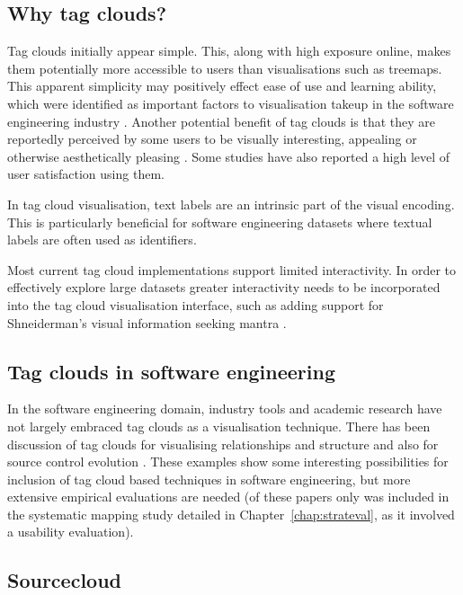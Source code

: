\subsection{Why tag clouds?}\label{sect:whytagclouds}

Tag clouds initially appear simple. This, along with high exposure online, makes them potentially more accessible to users than visualisations such as treemaps. This apparent simplicity may positively effect ease of use and learning ability, which were identified as important factors to visualisation takeup in the software engineering industry \citep{reiss05}. Another potential benefit of tag clouds is that they are reportedly perceived by some users to be visually interesting, appealing or otherwise aesthetically pleasing \citep{hearst08}. Some studies \citep[such as][]{kuo07} have also reported a high level of user satisfaction using them. 

In tag cloud visualisation, text labels are an intrinsic part of the visual encoding. This is particularly beneficial for software engineering datasets where textual labels are often used as identifiers.

Most current tag cloud implementations support limited interactivity. In order to effectively explore large datasets greater interactivity needs to be incorporated into the tag cloud visualisation interface, such as adding support for Shneiderman's visual information seeking mantra \citep{schneiderman96}.

\subsection{Tag clouds in software engineering}\label{sect:tagcloudsinsoftware}

In the software engineering domain, industry tools and academic research have not largely embraced tag clouds as a visualisation technique. There has been discussion of tag clouds for visualising relationships and structure \citep[such as][]{anslow08, bajracharya10, kurtz11} and also for source control evolution \citep[][]{kuhn12}. These examples show some interesting possibilities for inclusion of tag cloud based techniques in software engineering, but more extensive empirical evaluations are needed (of these papers only \citet{kurtz11} was included in the systematic mapping study detailed in Chapter~\ref{chap:strateval}, as it involved a usability evaluation). 

\subsection{Sourcecloud} 

